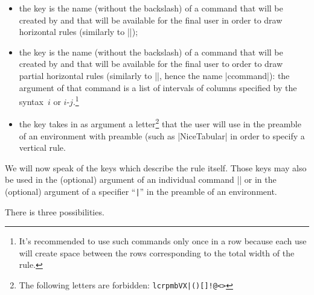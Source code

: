 \documentclass[dvipsnames]{article}%
\begin{document}
\begin{itemize}
\item the key  is the name (without the backslash) of a
command that will be created by  and that will be available for
the final user in order to draw horizontal rules (similarly to |\hline|);

\item the key  is the name (without the backslash) of a
command that will be created by  and that will be available for
the final user to order to draw partial horizontal rules (similarly to |\cline|,
hence the name |ccommand|): the argument of that command is a list of intervals
of columns specified by the syntax~$i$ or $i$-$j$.\footnote{It's recommended to
  use such commands only once in a row because each use will create space
  between the rows corresponding to the total width of the rule.}

\item the key  takes in as argument a letter\footnote{The following
letters are forbidden: \verb+lcrpmbVX|()[]!@<>+} that the user will use in
the preamble of an environment with preamble (such as |{NiceTabular}| in order
to specify a vertical rule.
\end{itemize}

\bigskip
We will now speak of the keys which describe the rule itself. Those keys may
also be used in the (optional) argument of an individual command |\Hline| or in
the (optional) argument of a specifier ``\verb+|+'' in the preamble of an
environment. 

\bigskip
There is three possibilities.
\end{document}
